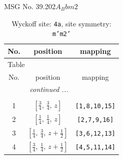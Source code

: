 \documentclass[fleqn,8pt]{jsarticle}
\begin{document}
\setcounter{MaxMatrixCols}{32}

\renewcommand{\tablename}{Table~}
\renewcommand{\figurename}{Figure~}
\begin{center}
\LARGE
MSG No. 39.202\quad$A_{B}bm2$
\end{center}
\renewcommand{\arraystretch}{1.2}
\begin{longtable}{ccc}
\caption{Wyckoff site: {\tt 4a}, site symmetry: {\tt m'm2'}}
 \\
 \hline \hline
No. & position & mapping \\ \hline \endfirsthead

\multicolumn{2}{l}{\tablename\ \thetable{}} \\
 \hline \hline
No. & position & mapping \\ \hline \endhead

 \hline \hline
\multicolumn{2}{r}{\footnotesize\it continued ...} \\ \endfoot

 \hline \hline
\multicolumn{2}{r}{} \\ \endlastfoot

1 & $\left[ \frac{3}{4},\, \frac{3}{4},\, z \right]$ & {\tt [1,8,10,15]} \\ \hline
2 & $\left[ \frac{1}{4},\, \frac{1}{4},\, z \right]$ & {\tt [2,7,9,16]} \\ \hline
3 & $\left[ \frac{1}{4},\, \frac{3}{4},\, z + \frac{1}{2} \right]$ & {\tt [3,6,12,13]} \\ \hline
4 & $\left[ \frac{3}{4},\, \frac{1}{4},\, z + \frac{1}{2} \right]$ & {\tt [4,5,11,14]} \\
\end{longtable}
\renewcommand{\arraystretch}{1.2}
\end{document}
